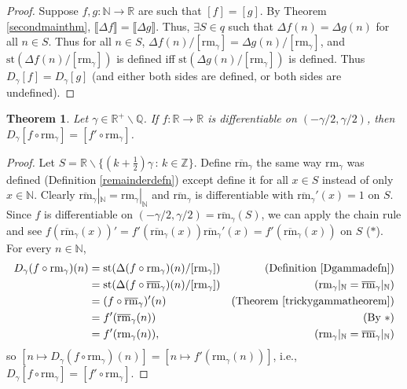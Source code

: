 \documentclass[microtype]{jloganal}
\newtheorem{theorem}{Theorem}
\def\RM{\mathrm{rm}}
\begin{document}
\begin{proof}
    Suppose $f,g:\mathbb N\to\mathbb R$ are such that
    $[f]=[g]$.
    By Theorem \ref{secondmainthm},
    $\llbracket \Delta f\rrbracket = \llbracket \Delta g\rrbracket$.
    Thus, $\exists S\in q$ such that
    $\Delta f(n)=\Delta g(n)$ for all $n\in S$.
    Thus for all $n\in S$, $\Delta f(n)/[\RM_\gamma]=\Delta g(n)/[\RM_\gamma]$,
    and $\mathrm{st}(\Delta f(n)/[\RM_\gamma])$ is defined
    iff $\mathrm{st}(\Delta g(n)/[\RM_\gamma])$ is defined.
    Thus $D_\gamma [f]=D_\gamma[g]$ (and either both sides are
    defined, or both sides are undefined).
\end{proof}

\begin{theorem}
\label{dimensionstheorem}
    Let $\gamma\in\mathbb R^+\backslash\mathbb Q$.
    If $f:\mathbb R\to\mathbb R$ is differentiable on
    $(-\gamma/2,\gamma/2)$,
    then
    $D_\gamma [f\circ \RM_\gamma] = [f'\circ \RM_\gamma]$.
\end{theorem}

\begin{proof}
    Let $S=\mathbb R\backslash\{(k+\frac12)\gamma\,:\,k\in\mathbb Z\}$.
    Define $\overline{\RM}_\gamma$ the same way
    $\RM_\gamma$ was defined (Definition \ref{remainderdefn})
    except define it for all $x\in S$ instead of only $x\in\mathbb N$.
    Clearly $\overline{\RM}_\gamma|_\mathbb N=\RM_\gamma|_\mathbb N$ and
    $\overline{\RM}_\gamma$ is differentiable with $\overline{\RM}_\gamma'(x)=1$ on
    $S$.
    Since $f$ is differentiable on
    $(-\gamma/2,\gamma/2)= \overline{\RM}_\gamma(S)$,
    we can apply the chain rule and see
    $f(\overline{\RM}_\gamma(x))'
    =f'(\overline{\RM}_\gamma(x))\overline{\RM}_\gamma'(x)
    =f'(\overline{\RM}_\gamma(x))$
    on $S$ ($*$).
    For every $n\in\mathbb N$,
    \begin{align*}
        D_\gamma (f\circ\RM_\gamma)(n)
            &= \mathrm{st}(\Delta (f\circ\RM_\gamma)(n)/[\RM_\gamma])
                &\mbox{(Definition \ref{Dgammadefn})}\\
            &= \mathrm{st}(\Delta (f\circ\overline{\RM}_\gamma)(n)/[\RM_\gamma])
                &\mbox{($\RM_\gamma|_\mathbb N=\overline{\RM}_\gamma|_\mathbb N$)}\\
            &= (f\circ\overline{\RM}_\gamma)'(n)
                &\mbox{(Theorem \ref{trickygammatheorem})}\\
            &= f'(\overline{\RM}_\gamma(n))
                &\mbox{(By $*$)}\\
            &= f'(\RM_\gamma(n)),
                &\mbox{($\RM_\gamma|_\mathbb N=\overline{\RM}_\gamma|_\mathbb N$)}
    \end{align*}
    so $[n\mapsto D_\gamma (f\circ\RM_\gamma)(n)]=[n\mapsto f'(\RM_\gamma(n))]$,
    i.e., $D_\gamma [f\circ \RM_\gamma]=[f'\circ \RM_\gamma]$.
\end{proof}
\end{document}
